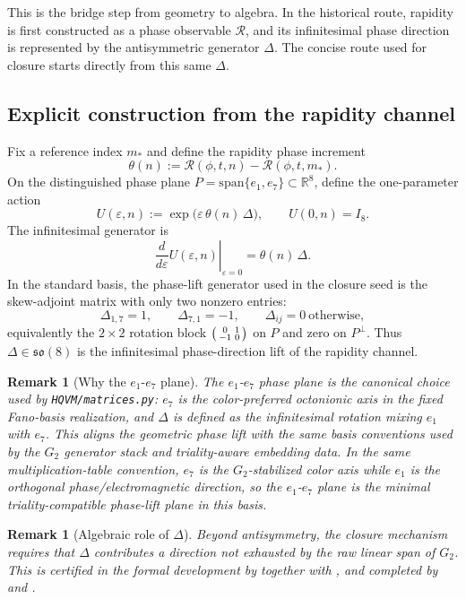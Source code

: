 \documentclass[11pt]{amsart}
\newtheorem{remark}[theorem]{Remark}
\begin{document}
This is the bridge step from geometry to algebra. In the historical route, rapidity is first constructed as a phase observable \(\mathcal R\), and its infinitesimal phase direction is represented by the antisymmetric generator \(\Delta\). The concise route used for closure starts directly from this same \(\Delta\).

\subsection*{Explicit construction from the rapidity channel}
Fix a reference index \(m_\ast\) and define the rapidity phase increment
\[
\theta(n):=\mathcal R(\phi,t,n)-\mathcal R(\phi,t,m_\ast).
\]
On the distinguished phase plane \(P=\mathrm{span}\{e_1,e_7\}\subset\mathbb R^8\), define the one-parameter action
\[
U(\varepsilon,n):=\exp\!\bigl(\varepsilon\,\theta(n)\,\Delta\bigr),\qquad U(0,n)=I_8.
\]
The infinitesimal generator is
\[
\left.\frac{d}{d\varepsilon}U(\varepsilon,n)\right|_{\varepsilon=0}
=\theta(n)\,\Delta.
\]
In the standard basis, the phase-lift generator used in the closure seed is the skew-adjoint matrix with only two nonzero entries:
\[
\Delta_{1,7}=1,\qquad \Delta_{7,1}=-1,\qquad \Delta_{ij}=0\ \text{otherwise},
\]
equivalently the \(2\times2\) rotation block
\(
\begin{psmallmatrix}0&1\\-1&0\end{psmallmatrix}
\)
on \(P\) and zero on \(P^\perp\). Thus \(\Delta\in\mathfrak{so}(8)\) is the infinitesimal phase-direction lift of the rapidity channel.

\begin{remark}[Why the \(e_1\)-\(e_7\) plane]
The \(e_1\)-\(e_7\) phase plane is the canonical choice used by \texttt{HQVM/matrices.py}: \(e_7\) is the color-preferred octonionic axis in the fixed Fano-basis realization, and \(\Delta\) is defined as the infinitesimal rotation mixing \(e_1\) with \(e_7\). This aligns the geometric phase lift with the same basis conventions used by the \(G_2\) generator stack and triality-aware embedding data.
In the same multiplication-table convention, \(e_7\) is the \(G_2\)-stabilized color axis while \(e_1\) is the orthogonal phase/electromagnetic direction, so the \(e_1\)-\(e_7\) plane is the minimal triality-compatible phase-lift plane in this basis.
\end{remark}

\begin{remark}[Algebraic role of \(\Delta\)]
Beyond antisymmetry, the closure mechanism requires that \(\Delta\) contributes a direction not exhausted by the raw linear span of \(G_2\). This is certified in the formal development by  together with , and completed by  and .
\end{remark}
\end{document}
